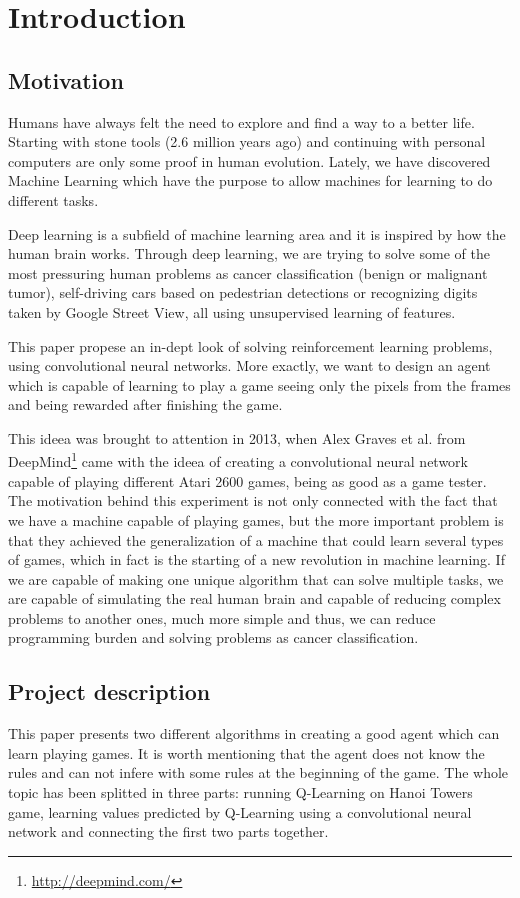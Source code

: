 \chapter{Introduction}
\label{chapter:intro}

\section{Motivation}
\label{sec:motivation}
Humans have always felt the need to explore and find a way to a better life. Starting with stone tools (2.6 million years ago) and continuing with personal computers are only some proof in human evolution. Lately, we have discovered Machine Learning which have the purpose to allow machines for learning to do different tasks.

Deep learning is a subfield of machine learning area and it is inspired by how the human brain works. Through deep learning, we are trying to solve some of the most pressuring human problems as cancer classification (benign or malignant tumor)\cite{mitosis}, self-driving cars based on pedestrian detections\cite{pedestrian} or recognizing digits taken by Google Street View\cite{svhn}, all using unsupervised learning of features.

This paper propese an in-dept look of solving reinforcement learning problems, using convolutional neural networks. More exactly, we want to design an agent which is capable of learning to play a game\cite{atari} seeing only the pixels from the frames and being rewarded after finishing the game.

This ideea was brought to attention in 2013, when Alex Graves et al. from DeepMind\footnote{\url{http://deepmind.com/}} came with the ideea of creating a convolutional neural network capable of playing different Atari 2600 games, being as good as a game tester. The motivation behind this experiment is not only connected with the fact that we have a machine capable of playing games, but the more important problem is that they achieved the generalization of a machine that could learn several types of games, which in fact is the starting of a new revolution in machine learning. If we are capable of making one unique algorithm that can solve multiple tasks, we are capable of simulating the real human brain and capable of reducing complex problems to another ones, much more simple and thus, we can reduce programming burden and solving problems as cancer classification.



\section{Project description}
\label{sec:proj-description}
This paper presents two different algorithms in creating a good agent which can learn playing games. It is worth mentioning that the agent does not know the rules and can not infere with some rules at the beginning of the game. The whole topic has been splitted in three parts: running Q-Learning on Hanoi Towers game, learning values predicted by Q-Learning using a convolutional neural network and connecting the first two parts together.


